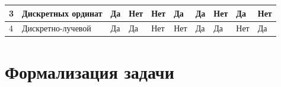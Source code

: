 \begin{FixLineStretch}
\begin{table}
\begin{tabular}{|p{\wA}|p{\wB}|p{\wC}|p{\wD}|p{\wE}|p{\wF}|p{\wG}|p{\wH}|p{\wI}|p{\wJ}|}
		3                    & \everypar{\hspace*{0pt}} Дискретных ординат \cite{surzhikov}                                            & Да                                                           & Нет                                                                             & Нет                                                                               & Да                                                       & Да                                                                                             & Нет                                                                                                        & Да                                                           & Нет                                      \\ \hline
		4                    & \everypar{\hspace*{0pt}} Дискретно-лучевой \cite{gradov-dissertation}                                   & Да                                                           & Да                                                                              & Нет                                                                               & Нет                                                      & Да                                                                                             & Да                                                                                                         & Нет                                                          & Да                                       \\ \hline
	\end{tabular}
\end{table}
\end{FixLineStretch}
\let\wJ\relax
\let\wI\relax
\let\wH\relax
\let\wG\relax
\let\wF\relax
\let\wE\relax
\let\wD\relax
\let\wC\relax
\let\wB\relax
\let\wA\relax

\section{Формализация задачи}


\let\wF\relax